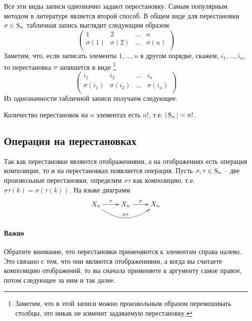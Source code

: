 Все эти виды записи однозначно задают перестановку.
Самым популярным методом в литературе является второй способ.
В общем виде для перестановки $\sigma\in\operatorname{S}_{n}$ табличная запись выглядит следующим образом:
\[
\begin{pmatrix}
{1}&{2}&{\ldots}&{n}\\
{\sigma(1)}&{\sigma(2)}&{\ldots}&{\sigma(n)}\\
\end{pmatrix}
\]
Заметим, что, если записать элементы $1,\ldots,n$ в другом порядке, скажем, $i_1,\ldots,i_n$, то перестановка $\sigma$ запишется в виде%
\footnote{Заметим, что в этой записи можно произвольным образом перемешивать столбцы, это никак не изменит задаваемую перестановку.}
\[
\begin{pmatrix}
{i_1}&{i_2}&{\ldots}&{i_n}\\
{\sigma(i_1)}&{\sigma(i_2)}&{\ldots}&{\sigma(i_n)}\\
\end{pmatrix}
\]
Из однозначности табличной записи получаем следующее.
\begin{claim*}
Количество перестановок на $n$ элементах есть $n!$, т.е. $|\operatorname{S}_{n}| = n!$.
\end{claim*}

\subsection{Операция на перестановках}
\label{section::PermOps}

Так как перестановки являются отображениями, а на отображениях есть операция композиции, то и на перестановках появляется операция.
Пусть $\sigma,\tau\in\operatorname{S}_{n}$ -- две произвольные перестановки, определим $\sigma \tau$ как композицию, т.е. $\sigma\tau(k) = \sigma(\tau(k))$.
На языке диаграмм
\[
\xymatrix{
	{X_n}\ar[r]^{\tau}\ar@/_20pt/[rr]^{\sigma\tau}&{X_n}\ar[r]^{\sigma}&{X_n}
}
\]

\paragraph{Важно}

Обратите внимание, что перестановки применяются к элементам справа налево.
Это связано с тем, что они являются отображениями, а когда вы считаете композицию отображений, то вы сначала применяете к аргументу самое правое, потом следующее за ним и так далее.

